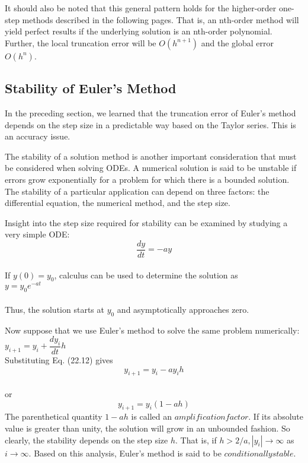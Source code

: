 \documentclass[../main.tex]{subfiles}
\begin{document}
It should also be noted that this general pattern holds for the higher-order one-step
methods described in the following pages. That is, an nth-order method will yield perfect
results if the underlying solution is an nth-order polynomial. Further, the local truncation
error will be $O(h^{n+1})$ and the global error $O(h^n)$.

\subsection{Stability of Euler's Method}
In the preceding section, we learned that the truncation error of Euler's method depends on
the step size in a predictable way based on the Taylor series. This is an accuracy issue.

The stability of a solution method is another important consideration that must be considered when solving ODEs. A numerical solution is said to be unstable if errors grow
exponentially for a problem for which there is a bounded solution. The stability of a particular application can depend on three factors: the differential equation, the numerical
method, and the step size.

Insight into the step size required for stability can be examined by studying a very
simple ODE:\\
\begin{equation}
\tag{22.12}
\dfrac{dy}{dt} = -ay
\end{equation}\\
If $y(0) = y_{0}$, calculus can be used to determine the solution as\\

$y=y_{0}e^{-at}$\\
\\
Thus, the solution starts at $y_{0}$ and asymptotically approaches zero.

Now suppose that we use Euler's method to solve the same problem numerically:\\

$y_{i+1} = y_{i} + \dfrac{dy_{i}}{dt} h$
\\
Substituting Eq. (22.12) gives\\

$$y_{i+1} = y_{i} - ay_{i}h$$\\
or\\
\begin{equation}
\tag{22.13}
y_{i+1} = y_{i}(1-ah)
\end{equation}
The parenthetical quantity $1 − ah$ is called an $amplification factor$. If its absolute value is
greater than unity, the solution will grow in an unbounded fashion. So clearly, the stability
depends on the step size $h$. That is, if $ h > 2/a, |y_{i}| \rightarrow \infty$ as $ i \rightarrow \infty $. Based on this analysis, Euler's method is said to be $conditionally stable$.
\end{document}
